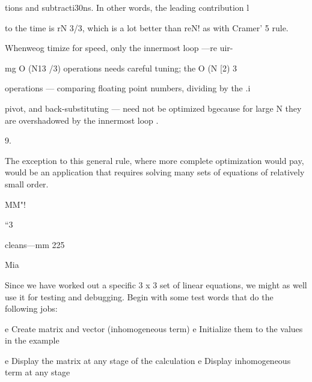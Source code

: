  

tions and subtracti30ns. In other words, the leading contribution l

to the time is rN 3/3, which is a lot better than reN! as with
Cramer’ 5 rule.

Whenweog timize for speed, only the innermost loop —re uir-

mg O (N13 /3) operations needs careful tuning; the O (N [2) 3

operations — comparing ﬂoating point numbers, dividing by the .i

pivot, and back-substituting — need not be optimized bgecause for
large N they are overshadowed by the innermost loop .

 

9.

The exception to this general rule, where more complete optimization would pay, would be an
application that requires solving many sets of equations of relatively small order.

 

MM"!

“3

cleans—mm 225

Mia

Since we have worked out a speciﬁc 3 x 3 set of linear equations,
we might as well use it for testing and debugging. Begin with
some test words that do the following jobs:

e Create matrix and vector (inhomogeneous term)
e Initialize them to the values in the example

e Display the matrix at any stage of the calculation
e Display inhomogeneous term at any stage

